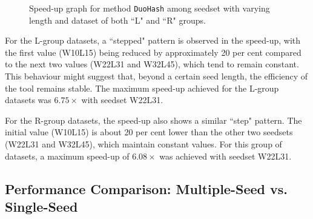 	\begin{figure}[!ht]
		\centering
		\caption{Speed-up graph for method \texttt{DuoHash} among seedset with varying length and dataset of both “L" and “R" groups.}
		\label{fig:speedup-MISSH_v1-varying-length}
	\end{figure}
	
	
	For the L-group datasets, a “stepped" pattern is observed in the speed-up, with the first value (W10L15) being reduced by approximately 20 per cent compared to the next two values (W22L31 and W32L45), which tend to remain constant. This behaviour might suggest that, beyond a certain seed length, the efficiency of the tool remains stable. The maximum speed-up achieved for the L-group datasets was $6.75\times$ with seedset W22L31.
	
	For the R-group datasets, the speed-up also shows a similar “step" pattern. The initial value (W10L15) is about 20 per cent lower than the other two seedsets (W22L31 and W32L45), which maintain constant values. For this group of datasets, a maximum speed-up of $6.08\times$ was achieved with seedset W22L31.




	\subsection{Performance Comparison: Multiple-Seed vs. Single-Seed}
	\label{subsec:performance-comparison-multi-vs-single-seed}
	
